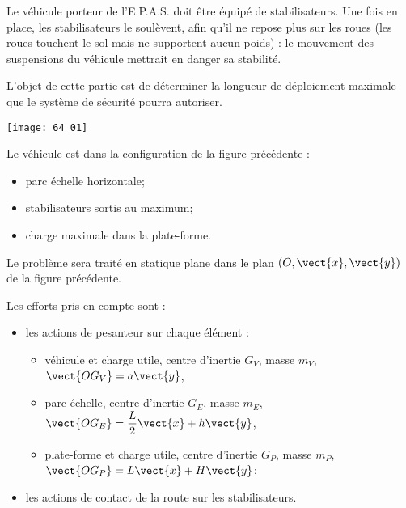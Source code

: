 \normalfalse \difficiletrue \tdifficilefalse
\correctionfalse


\setcounter{question}{0}
\ifcorrection
\else
{}
\fi
\ifprof
\else

Le véhicule porteur de l’E.P.A.S. doit être équipé de stabilisateurs. Une fois en place, les
stabilisateurs le soulèvent, afin qu’il ne repose plus sur les roues (les roues touchent le sol mais ne
supportent aucun poids) : le mouvement des suspensions du véhicule mettrait en danger sa stabilité.

L’objet de cette partie est de déterminer la longueur de déploiement maximale que le système de
sécurité pourra autoriser.

\begin{center}
\texttt{[image: 64\_01]}
\end{center}

Le véhicule est dans la configuration de la figure précédente :
\begin{itemize}
\item parc échelle horizontale;
\item stabilisateurs sortis au maximum;
\item charge maximale dans la plate-forme.
\end{itemize}

Le problème sera traité en statique plane dans le plan $\left(O, \vect{x}, \vect{y}\right)$ de la figure précédente.

Les efforts pris en compte sont :
\begin{itemize}
\item les actions de pesanteur sur chaque élément :
\begin{itemize}
\item véhicule et charge utile, centre d'inertie $G_V$, masse $m_V$, $\vect{OG_V}=a\vect{y}$,
\item parc échelle, centre d'inertie $G_E$, masse $m_E$, $\vect{OG_E}=\dfrac{L}{2}\vect{x}+h\vect{y}$,
\item plate-forme et charge utile, centre d'inertie $G_P$, masse $m_P$, $\vect{OG_P}={L}\vect{x}+H\vect{y}$;
\end{itemize}
\item les actions de contact de la route sur les stabilisateurs.
\end{itemize}

